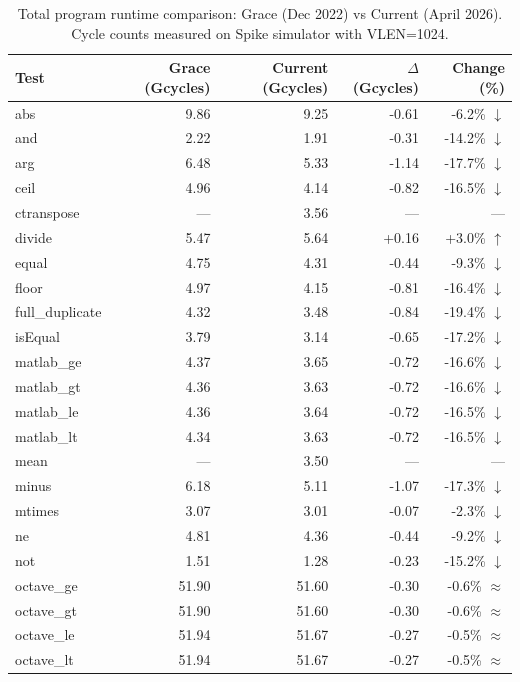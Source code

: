 \begin{table}[H]
\centering
\caption{Total program runtime comparison: Grace (Dec 2022) vs Current (April 2026). Cycle counts measured on Spike simulator with VLEN=1024.}
\label{tab:total-runtime}
\small
\begin{tabular}{l r r r r}
\toprule
Test & Grace (Gcycles) & Current (Gcycles) & $\Delta$ (Gcycles) & Change (\%) \\
\midrule
  abs & 9.86 & 9.25 & -0.61 & -6.2\% $\downarrow$ \\
  and & 2.22 & 1.91 & -0.31 & -14.2\% $\downarrow$ \\
  arg & 6.48 & 5.33 & -1.14 & -17.7\% $\downarrow$ \\
  ceil & 4.96 & 4.14 & -0.82 & -16.5\% $\downarrow$ \\
  ctranspose & --- & 3.56 & --- & ---  \\
  divide & 5.47 & 5.64 & +0.16 & +3.0\% $\uparrow$ \\
  equal & 4.75 & 4.31 & -0.44 & -9.3\% $\downarrow$ \\
  floor & 4.97 & 4.15 & -0.81 & -16.4\% $\downarrow$ \\
  full\_duplicate & 4.32 & 3.48 & -0.84 & -19.4\% $\downarrow$ \\
  isEqual & 3.79 & 3.14 & -0.65 & -17.2\% $\downarrow$ \\
  matlab\_ge & 4.37 & 3.65 & -0.72 & -16.6\% $\downarrow$ \\
  matlab\_gt & 4.36 & 3.63 & -0.72 & -16.6\% $\downarrow$ \\
  matlab\_le & 4.36 & 3.64 & -0.72 & -16.5\% $\downarrow$ \\
  matlab\_lt & 4.34 & 3.63 & -0.72 & -16.5\% $\downarrow$ \\
  mean & --- & 3.50 & --- & ---  \\
  minus & 6.18 & 5.11 & -1.07 & -17.3\% $\downarrow$ \\
  mtimes & 3.07 & 3.01 & -0.07 & -2.3\% $\downarrow$ \\
  ne & 4.81 & 4.36 & -0.44 & -9.2\% $\downarrow$ \\
  not & 1.51 & 1.28 & -0.23 & -15.2\% $\downarrow$ \\
  octave\_ge & 51.90 & 51.60 & -0.30 & -0.6\% $\approx$ \\
  octave\_gt & 51.90 & 51.60 & -0.30 & -0.6\% $\approx$ \\
  octave\_le & 51.94 & 51.67 & -0.27 & -0.5\% $\approx$ \\
  octave\_lt & 51.94 & 51.67 & -0.27 & -0.5\% $\approx$ \\

\end{tabular}
\end{table}
